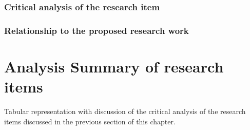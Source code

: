 \subsubsection{Critical analysis of the research item}
\subsubsection{Relationship to the proposed research work}

\section{Analysis Summary of research items}

Tabular representation with discussion of the critical analysis of the research items discussed in the previous section of this chapter.